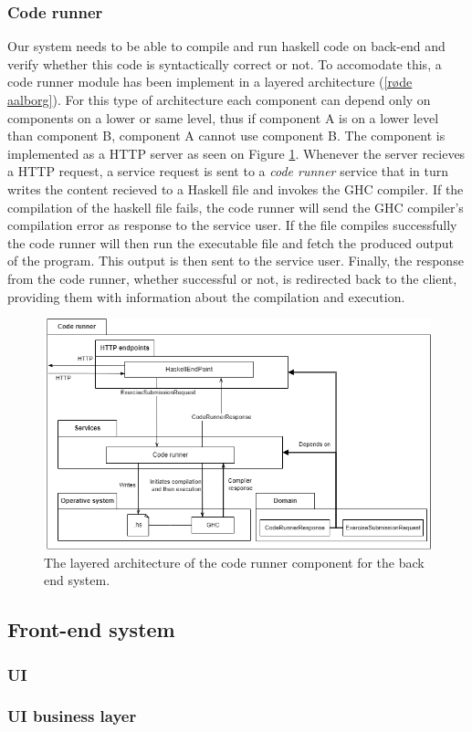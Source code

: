 \subsubsection{Code runner}
Our system needs to be able to compile and run haskell code on back-end and verify whether this code is syntactically correct or not.
To accomodate this, a code runner module has been implement in a layered architecture (\ref{røde aalborg}).
For this type of architecture each component can depend only on components on a lower or same level, thus if component A is on a lower level than component B, component A cannot use component B.
The component is implemented as a HTTP server as seen on Figure \ref{fig:code_runner}.
Whenever the server recieves a HTTP request, a service request is sent to a \textit{code runner} service that in turn writes the content recieved to a Haskell file and invokes the GHC compiler.
If the compilation of the haskell file fails, the code runner will send the GHC compiler's compilation error as response to the service user.
If the file compiles successfully the code runner will then run the executable file and fetch the produced output of the program.
This output is then sent to the service user.
Finally, the response from the code runner, whether successful or not, is redirected back to the client, providing them with information about the compilation and execution.


\begin{figure}
    \centering
    \includegraphics[width=\textwidth,height=\textheight,keepaspectratio]{sections/Chapter 2/pics/P7 arch-Backend - HS compiler.drawio.png}
    \caption[]{The layered architecture of the code runner component for the back end system.}
    \label{fig:code_runner}
\end{figure}

\subsection{Front-end system}

\subsubsection{UI}

\subsubsection{UI business layer}